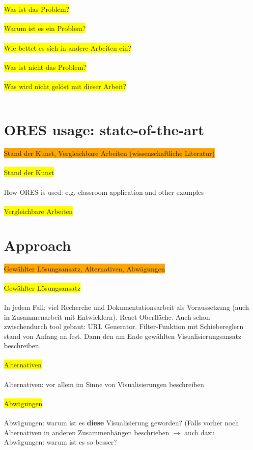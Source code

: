 \documentclass[12pt,a4paper]{article}
\begin{document}
\\
\\
\colorbox{yellow}{Was ist das Problem?}
\\
\\
\colorbox{yellow}{Warum ist es ein Problem?}
\\
\\
\colorbox{yellow}{Wie bettet es sich in andere Arbeiten ein?}
\\
\\
\colorbox{yellow}{Was ist nicht das Problem?}
\\
\\
\colorbox{yellow}{Was wird nicht gelöst mit dieser Arbeit?}
\\
\\
%
%
%
\section{ORES usage: state-of-the-art}
\colorbox{orange}{Stand der Kunst, Vergleichbare Arbeiten (wissenschaftliche Literatur)}
\\
\\
\colorbox{yellow}{Stand der Kunst}
\\
\\
How ORES is used: e.g. classroom application and other examples
\\
\\
\colorbox{yellow}{Vergleichbare Arbeiten}
%
%
%
\section{Approach}
\colorbox{orange}{Gewählter Lösungsansatz, Alternativen, Abwägungen}
\\
\\
\colorbox{yellow}{Gewählter Lösungsansatz}
\\
\\
In jedem Fall: viel Recherche und Dokumentationsarbeit als Voraussetzung (auch in Zusammenarbeit mit Entwicklern). React Oberfläche. Auch schon zwischendurch tool gebaut: URL Generator. Filter-Funktion mit Schiebereglern stand von Anfang an fest. Dann den am Ende gewählten Visualisierungsansatz beschreiben.
\\
\\
\colorbox{yellow}{Alternativen}
\\
\\
Alternativen: vor allem im Sinne von Visualisierungen beschreiben
\\
\\
\colorbox{yellow}{Abwägungen}
\\
\\
Abwägungen: warum ist es \textbf{diese} Visualisierung geworden? (Falls vorher noch Alternativen in anderen Zusammenhängen beschrieben $\rightarrow$ auch dazu Abwägungen: warum ist es so besser?
\\
\\
\end{document}
